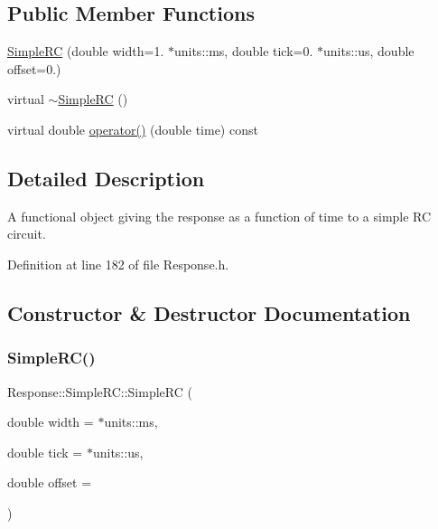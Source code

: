 \subsection*{Public Member Functions}
\begin{DoxyCompactItemize}
\item 
\hyperlink{class_wire_cell_1_1_response_1_1_simple_r_c_a2050c9b1bf345914e6b2fa571e6a0531}{Simple\+RC} (double width=1. $\ast$units\+::ms, double tick=0. $\ast$units\+::us, double offset=0.)
\item 
virtual \hyperlink{class_wire_cell_1_1_response_1_1_simple_r_c_aa01e593768153361361d17af2932e8e2}{$\sim$\+Simple\+RC} ()
\item 
virtual double \hyperlink{class_wire_cell_1_1_response_1_1_simple_r_c_a161bf08999bc62f35b1b1c5569053e06}{operator()} (double time) const
\end{DoxyCompactItemize}


\subsection{Detailed Description}
A functional object giving the response as a function of time to a simple RC circuit. 

Definition at line 182 of file Response.\+h.



\subsection{Constructor \& Destructor Documentation}
\mbox{\label{class_wire_cell_1_1_response_1_1_simple_r_c_a2050c9b1bf345914e6b2fa571e6a0531}} 
\subsubsection{\texorpdfstring{Simple\+R\+C()}{SimpleRC()}}
{\footnotesize\ttfamily Response\+::\+Simple\+R\+C\+::\+Simple\+RC (\begin{DoxyParamCaption}\item[{double}]{width = {$\ast$units\+:\+:ms},  }\item[{double}]{tick = {$\ast$units\+:\+:us},  }\item[{double}]{offset = {} }\end{DoxyParamCaption})}



